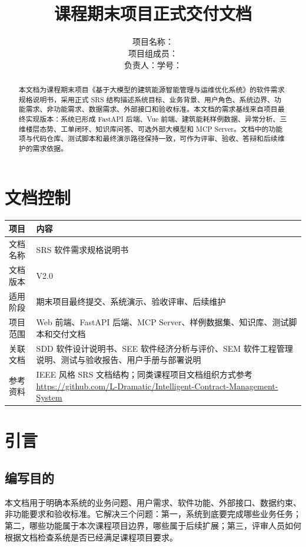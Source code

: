 \documentclass[12pt,a4paper]{ctexart}
\title{
    \vspace{-2em}
    \heiti \zihao{2} \reporttitle \\
    \vspace{1em}
    \zihao{4} 课程期末项目正式交付文档
}
\author{
    \songti \zihao{4}
    项目名称：\projectname \\
    项目组成员：\teamname \\
    负责人：\studentname \quad 学号：\studentid
}
\date{\docdate}
\newcommand{\projectname}{基于大模型的建筑能源智能管理与运维优化系统}
\newcommand{\docversion}{V2.0}
\begin{document}
\maketitle
\thispagestyle{fancy}

\begin{abstract}
本文档为课程期末项目《\projectname》的软件需求规格说明书，采用正式 SRS 结构描述系统目标、业务背景、用户角色、系统边界、功能需求、非功能需求、数据需求、外部接口和验收标准。本文档的需求基线来自项目最终实现版本：系统已形成 FastAPI 后端、Vue 前端、建筑能耗样例数据、异常分析、三维楼层态势、工单闭环、知识库问答、可选外部大模型和 MCP Server。文档中的功能项与代码仓库、测试脚本和最终演示路径保持一致，可作为评审、验收、答辩和后续维护的需求依据。
\end{abstract}

\tableofcontents
\newpage

\section{文档控制}
\begin{longtable}{p{4cm}p{10.5cm}}
\toprule
项目 & 内容 \\
\midrule
文档名称 & SRS 软件需求规格说明书 \\
文档版本 & \docversion \\
适用阶段 & 期末项目最终提交、系统演示、验收评审、后续维护 \\
项目范围 & Web 前端、FastAPI 后端、MCP Server、样例数据集、知识库、测试脚本和交付文档 \\
关联文档 & SDD 软件设计说明书、SEE 软件经济分析与评价、SEM 软件工程管理说明、测试与验收报告、用户手册与部署说明 \\
参考资料 & IEEE 风格 SRS 文档结构；同类课程项目文档组织方式参考 \url{https://github.com/L-Dramatic/Intelligent-Contract-Management-System} \\
\bottomrule
\end{longtable}

\section{引言}
\subsection{编写目的}
本文档用于明确本系统的业务问题、用户需求、软件功能、外部接口、数据约束、非功能要求和验收标准。它解决三个问题：第一，系统到底要完成哪些业务任务；第二，哪些功能属于本次课程项目边界，哪些属于后续扩展；第三，评审人员如何根据文档检查系统是否已经满足课程项目要求。
\end{document}
